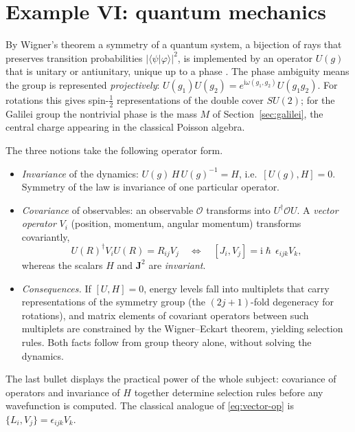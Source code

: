 \documentclass[11pt,a4paper,openany]{book}
\theoremstyle{definition}
\theoremstyle{plain}
\theoremstyle{remark}
\DeclareRobustCommand{\hbar}{\hslash}
\newcommand{\ii}{\mathrm{i}}
\newcommand{\Poi}[2]{\{#1,#2\}}
\begin{document}
\section{Example VI: quantum mechanics}
\label{sec:quantum}

By Wigner's theorem a symmetry of a quantum system, a bijection of rays that
preserves transition probabilities $|\langle\psi|\varphi\rangle|^2$, is
implemented by an operator $U(g)$ that is unitary or antiunitary, unique up to
a phase \cite{wigner}. The phase ambiguity means the group is represented
\emph{projectively}:
$U(g_1)U(g_2)=e^{\ii\omega(g_1,g_2)}U(g_1g_2)$. For rotations this gives
spin-$\tfrac12$ representations of the double cover $SU(2)$; for the
Galilei group the nontrivial phase is the mass $M$ of
Section~\ref{sec:galilei}, the central charge appearing in the classical
Poisson algebra.

The three notions take the following operator form.
\begin{itemize}[leftmargin=1.6em,itemsep=2pt]
\item \emph{Invariance} of the dynamics: $U(g)\,H\,U(g)^{-1}=H$, i.e.\
  $[U(g),H]=0$. Symmetry of the law is invariance of one particular operator.
\item \emph{Covariance} of observables: an observable $\mathcal O$
  transforms into $U^\dagger\mathcal OU$. A \emph{vector operator} $V_i$
  (position, momentum, angular momentum) transforms covariantly,
  \begin{equation}\label{eq:vector-op}
    U(R)^\dagger V_iU(R)=R_{ij}V_j\quad\Longleftrightarrow\quad
    [J_i,V_j]=\ii\hbar\,\epsilon_{ijk}V_k,
  \end{equation}
  whereas the scalars $H$ and $\bm J^2$ are \emph{invariant}.
\item \emph{Consequences.} If $[U,H]=0$, energy levels fall into multiplets
  that carry representations of the symmetry group (the $(2j{+}1)$-fold
  degeneracy for rotations), and matrix elements of covariant operators
  between such multiplets are constrained by the Wigner--Eckart theorem,
  yielding selection rules. Both facts follow from group theory alone,
  without solving the dynamics.
\end{itemize}
The last bullet displays the practical power of the whole subject:
covariance of operators and invariance of $H$ together determine selection
rules before any wavefunction is computed. The classical analogue of
\eqref{eq:vector-op} is $\Poi{L_i}{V_j}=\epsilon_{ijk}V_k$.
\end{document}
